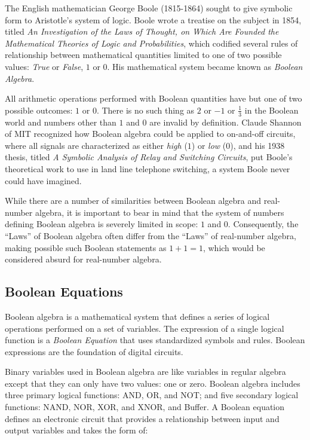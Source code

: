 The English mathematician George Boole (1815-1864) sought to give symbolic form to Aristotle's system of logic. Boole wrote a treatise on the subject in 1854, titled \emph{An Investigation of the Laws of Thought, on Which Are Founded the Mathematical Theories of Logic and Probabilities}, which codified several rules of relationship between mathematical quantities limited to one of two possible values: \emph{True} or \emph{False}, $ 1 $ or $ 0 $. His mathematical system became known as \emph{Boolean Algebra}.

All arithmetic operations performed with Boolean quantities have but one of two possible outcomes: $ 1 $ or $ 0 $. There is no such thing as $ 2 $ or $ -1 $ or $ \frac{1}{3} $ in the Boolean world and numbers other than $ 1 $ and $ 0 $ are invalid by definition. Claude Shannon of MIT recognized how Boolean algebra could be applied to on-and-off circuits, where all signals are characterized as either \emph{high} ($ 1 $) or \emph{low} ($ 0 $), and his 1938 thesis, titled \emph{A Symbolic Analysis of Relay and Switching Circuits}, put Boole's theoretical work to use in land line telephone switching, a system Boole never could have imagined.

While there are a number of similarities between Boolean algebra and real-number algebra, it is important to bear in mind that the system of numbers defining Boolean algebra is severely limited in scope: $ 1 $ and $ 0 $. Consequently, the ``Laws'' of Boolean algebra often differ from the ``Laws'' of real-number algebra, making possible such Boolean statements as $ 1 + 1 = 1 $, which would be considered absurd for real-number algebra. 

\subsection{Boolean Equations}

Boolean algebra is a mathematical system that defines a series of logical operations performed on a set of variables. The expression of a single logical function is a \emph{Boolean Equation}  that uses standardized symbols and rules. Boolean expressions are the foundation of digital circuits.

Binary variables used in Boolean algebra are like variables in regular algebra except that they can only have two values: one or zero. Boolean algebra includes three primary logical functions: \textsf{AND}, \textsf{OR}, and \textsf{NOT}; and five secondary logical functions:  \textsf{NAND}, \textsf{NOR}, \textsf{XOR}, and \textsf{XNOR}, and Buffer. A Boolean equation defines an electronic circuit that provides a relationship between input and output variables and takes the form of:

